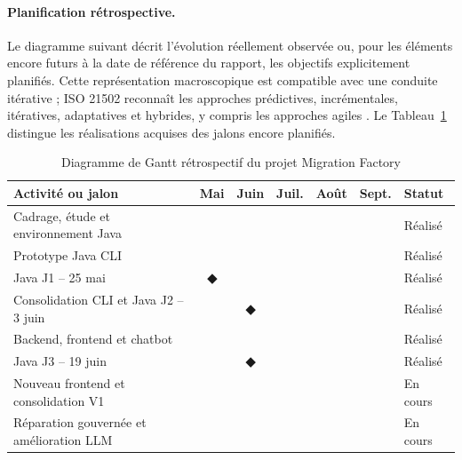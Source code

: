 \paragraph{Planification rétrospective.}
Le diagramme suivant décrit l'évolution réellement observée ou, pour les éléments encore futurs à la date de référence du rapport, les objectifs explicitement planifiés. Cette représentation macroscopique est compatible avec une conduite itérative ; ISO 21502 reconnaît les approches prédictives, incrémentales, itératives, adaptatives et hybrides, y compris les approches agiles \cite{iso21502}. Le Tableau~\ref{tab:gantt-retrospectif-ch1} distingue les réalisations acquises des jalons encore planifiés.

\scriptsize
\begin{table}[H]
    \centering
    \caption{Diagramme de Gantt rétrospectif du projet Migration Factory}
    \label{tab:gantt-retrospectif-ch1}
    \begin{tabularx}{\textwidth}{|>{\RaggedRight\arraybackslash}p{4.6cm}|c|c|c|c|c|>{\RaggedRight\arraybackslash}X|}
        \hline
        \rowcolor{cgilight!95}
        \textbf{Activité ou jalon} & \textbf{Mai} & \textbf{Juin} & \textbf{Juil.} & \textbf{Août} & \textbf{Sept.} & \textbf{Statut} \\
        \hline
        Cadrage, étude et environnement Java & \cellcolor{cgiblue!50} & & & & & Réalisé \\
        \hline
        Prototype Java CLI & \cellcolor{cgiblue!50} & & & & & Réalisé \\
        \hline
        Java J1 -- 25 mai & \cellcolor{cgired!25}\textbf{◆} & & & & & Réalisé \\
        \hline
        Consolidation CLI et Java J2 -- 3 juin & \cellcolor{cgiblue!35} & \cellcolor{cgired!25}\textbf{◆} & & & & Réalisé \\
        \hline
        Backend, frontend et chatbot & & \cellcolor{cgiblue!50} & & & & Réalisé \\
        \hline
        Java J3 -- 19 juin & & \cellcolor{cgired!25}\textbf{◆} & & & & Réalisé \\
        \hline
        Nouveau frontend et consolidation V1 & & \cellcolor{cgiblue!35} & \cellcolor{cgiblue!50} & \cellcolor{cgiblue!50} & \cellcolor{cgiblue!25} & En cours \\
        \hline
        Réparation gouvernée et amélioration LLM & & \cellcolor{cgiblue!35} & \cellcolor{cgiblue!50} & \cellcolor{cgiblue!50} & \cellcolor{cgiblue!25} & En cours \\

\end{tabularx}
\end{table}
